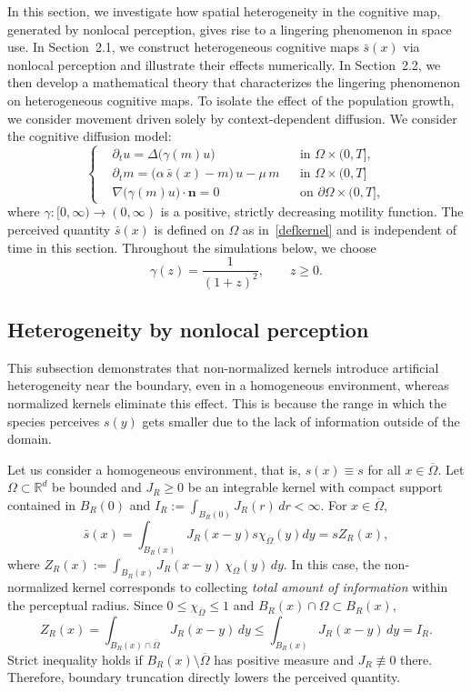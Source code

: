 \documentclass{article}
\begin{document}
In this section, we investigate how spatial heterogeneity in the cognitive map, generated by nonlocal perception, gives rise to a lingering phenomenon in space use. In Section~2.1, we construct heterogeneous cognitive maps \(\bar s(x)\) via nonlocal perception and illustrate their effects numerically. In Section~2.2, we then develop a mathematical theory that characterizes the lingering phenomenon on heterogeneous cognitive maps. To isolate the effect of the population growth, we consider movement driven solely by context-dependent diffusion. We consider the cognitive diffusion model:
\begin{equation}\label{eqn: dispersalonly}
\left\{
\begin{aligned}
&\partial_t u  = \Delta\big(\gamma(m) u\big)
&& \text{in } \Omega\times(0,T], \\[4pt]
&\partial_t m = \big(\alpha\,\bar s(x)-m\big)\,u - \mu\,m
&& \text{in } \Omega\times(0,T]\\
&\nabla \big(\gamma(m) u\big)\cdot \mathbf{n} = 0
&& \text{on } \partial\Omega\times(0,T],
\end{aligned}
\right.
\end{equation} where \(\gamma:[0,\infty)\to(0,\infty)\) is a positive, strictly decreasing motility function. The perceived quantity \(\bar s(x)\) is defined on \(\Omega\) as in~\eqref{defkernel} and is independent of time in this section. Throughout the simulations below, we choose
\begin{equation}\label{gamma}
\gamma(z) = \frac{1}{(1+z)^2}, \qquad z \ge 0.
\end{equation}


\subsection{Heterogeneity by nonlocal perception}
\hspace{.1cm}
This subsection demonstrates that non-normalized kernels introduce artificial heterogeneity near the boundary, even in a homogeneous environment, whereas normalized kernels eliminate this effect.
This is because the range in which the species perceives $s(y)$ gets smaller due to the lack of information outside of the domain. 

Let us consider a homogeneous environment, that is, $s(x)\equiv s$ for all $x\in\overline{\Omega}$.
Let $\Omega\subset\mathbb{R}^d$ be bounded and $J_R\ge 0$ be an integrable kernel with compact support contained in $B_R(0)$ and 
$I_R:=\int_{B_R(0)} J_R(r)\,dr<\infty$. For $x\in\overline\Omega$, 
\[ \bar s(x) = \int_{B_R(x)}J_R(x-y)s\chi_{\overline{\Omega}}(y)dy=sZ_R(x),\] where $Z_R(x):=\int_{B_R(x)} J_R(x-y)\,\chi_{\overline\Omega}(y)\,dy$. In this case, the non-normalized kernel corresponds to collecting \emph{total amount of information} within the perceptual radius.
Since $0\le\chi_{\overline\Omega}\le1$ and $B_R(x)\cap\Omega\subset B_R(x)$,
\[
Z_R(x)=\int_{B_R(x)\cap\overline\Omega} J_R(x-y)\,dy
\le\int_{B_R(x)} J_R(x-y)\,dy=I_R.
\] 
Strict inequality holds if $B_R(x)\setminus\overline\Omega$ has positive measure and $J_R\not\equiv0$ there. Therefore, boundary truncation directly lowers the perceived quantity. 
\end{document}
